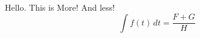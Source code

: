 \documentclass[12pt,reqno]{amsart}
\begin{document}
Hello.
This is More!
And less!
$$\int f(t)\,dt=\frac{F+G}{H}$$
\end{document}
